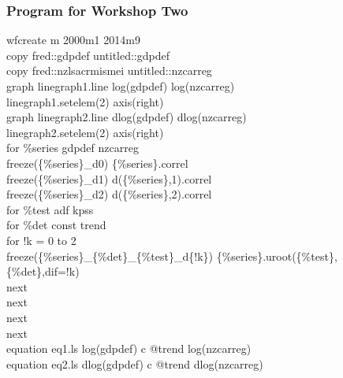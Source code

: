 \documentclass[a4paper,10pt]{article}
\begin{document}
\subsubsection*{Program for Workshop Two}
wfcreate m 2000m1 2014m9\\
copy fred::gdpdef untitled::gdpdef\\
copy fred::nzlsacrmismei untitled::nzcarreg\\
graph linegraph1.line log(gdpdef) log(nzcarreg)\\
linegraph1.setelem(2) axis(right)\\
graph linegraph2.line dlog(gdpdef) dlog(nzcarreg)\\
linegraph2.setelem(2) axis(right)\\
for \%series gdpdef nzcarreg\\
\indent	freeze(\{\%series\}\_d0) \{\%series\}.correl\\
\indent	freeze(\{\%series\}\_d1) d(\{\%series\},1).correl\\
\indent	freeze(\{\%series\}\_d2) d(\{\%series\},2).correl\\
\indent for \%test adf kpss\\
\indent \indent		for \%det const trend\\
\indent \indent \indent for !k = 0 to 2\\
\indent \indent \indent \indent			freeze(\{\%series\}\_\{\%det\}\_\{\%test\}\_d\{!k\})	\{\%series\}.uroot(\{\%test\},\{\%det\},dif=!k)\\
\indent \indent \indent next\\
\indent \indent		next\\
\indent	next\\
next\\
equation eq1.ls log(gdpdef) c @trend log(nzcarreg)\\
equation eq2.ls dlog(gdpdef) c @trend dlog(nzcarreg)\\
\end{document}
